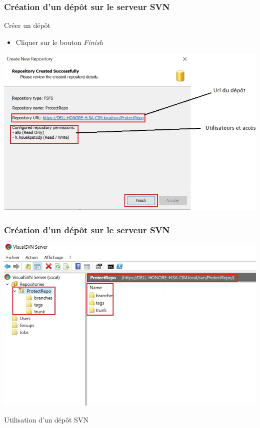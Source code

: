 \documentclass{beamer}
\begin{document}
\begin{frame}
\frametitle{Création d'un dépôt sur le serveur SVN}
\begin{block}{Créer un dépôt}
\begin{itemize}
\item Cliquer sur le bouton \alert{\textit{Finish}}
\end{itemize}
\end{block}
\includegraphics[scale=.5]{../images/server14.jpg}
\end{frame}


\begin{frame}
\frametitle{Création d'un dépôt sur le serveur SVN}
\includegraphics[scale=.5]{../images/server15.jpg}
\end{frame}

\begin{frame}
\begin{center}
\huge{Utilisation d'un dépôt SVN}
\end{center}
\end{frame}
\end{document}
